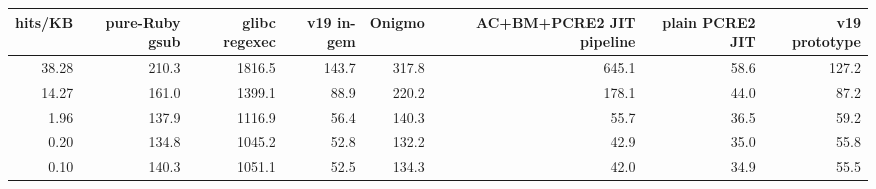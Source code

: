 \begin{tabular}{rrrrrrrr}
\toprule
hits/KB & pure-Ruby gsub & glibc regexec & v19 in-gem & Onigmo & AC+BM+PCRE2 JIT pipeline & plain PCRE2 JIT & v19 prototype \\
\midrule
38.28 & 210.3 & 1816.5 & 143.7 & 317.8 & 645.1 & 58.6 & 127.2 \\
14.27 & 161.0 & 1399.1 & 88.9 & 220.2 & 178.1 & 44.0 & 87.2 \\
1.96 & 137.9 & 1116.9 & 56.4 & 140.3 & 55.7 & 36.5 & 59.2 \\
0.20 & 134.8 & 1045.2 & 52.8 & 132.2 & 42.9 & 35.0 & 55.8 \\
0.10 & 140.3 & 1051.1 & 52.5 & 134.3 & 42.0 & 34.9 & 55.5 \\
\bottomrule
\end{tabular}

